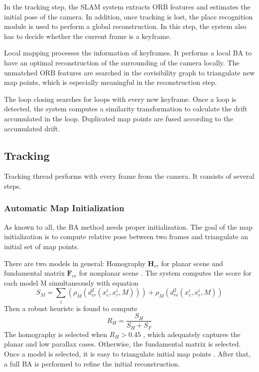 \documentclass[letterpaper, 10 pt, conference]{ieeeconf}  %
\begin{document}
In the tracking step, the SLAM system extracts ORB features and estimates the initial pose of the camera. In addition, once tracking is lost,  the place recognition module is used to perform a global reconstruction. In this step, the system also has to decide whether the current frame is a keyframe. 

Local mapping processes the information of keyframes. It performs a local BA to have an optimal reconstruction of the surrounding of the camera locally. The unmatched ORB features are searched in the covisibility graph to triangulate new map points, which is especially meaningful in the reconstruction step.

The loop closing searches for loops with every new keyframe. Once a loop is detected, the system computes a similarity transformation to calculate the drift accumulated in the loop. Duplicated map points are fused according to the accumulated drift.


\subsection{Tracking}
Tracking thread performs with every frame from the camera. It consists of several steps.
\subsubsection{Automatic Map Initialization}
\label{map_init}
As known to all, the BA method needs proper initialization. The goal of the map initialization is to compute relative pose between two frames and triangulate an initial set of map points.

There are two models in general: Homography $\textbf{H}_{cr}$ for planar scene and fundamental matrix $\textbf{F}_{cr}$ for nonplanar scene \cite{2}. The system computes the score for each model M simultaneously with equation
%
\begin{equation}
S_M = \sum_i(\rho_M(d_{cr}^2(x_c^i,x_r^i,M)))+\rho_M(d_{rc}^2(x_c^i, x_r^i, M))
\end{equation}
%
Then a robust heuristc is found to compute
%
\begin{equation}
R_H = \frac{S_H}{S_H+S_F}
\end{equation}
%
The homography is selected when $R_{H}>0.45$ , which adequately captures the planar and low parallax cases. Otherwise, the fundamental matrix is selected. Once a model is selected, it is easy to triangulate initial map points \cite{23}. After that, a full BA is performed to refine the initial reconstruction.
\end{document}
